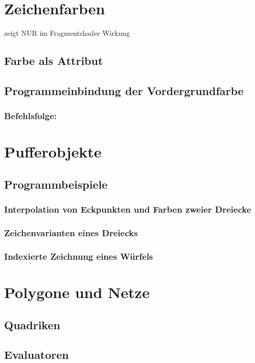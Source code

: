 \section{Zeichenfarben}
zeigt NUR im Fragmentshader Wirkung
\subsection{Farbe als Attribut}
\subsection{Programmeinbindung der Vordergrundfarbe}
\subsubsection*{Befehlsfolge:}

\section{Pufferobjekte}
\subsection{Programmbeispiele}
\subsubsection*{Interpolation von Eckpunkten und Farben zweier Dreiecke}
\subsubsection*{Zeichenvarianten eines Dreiecks}
\subsubsection*{Indexierte Zeichnung eines Würfels}

\section{Polygone und Netze}
\subsection{Quadriken}
\subsection{Evaluatoren}

